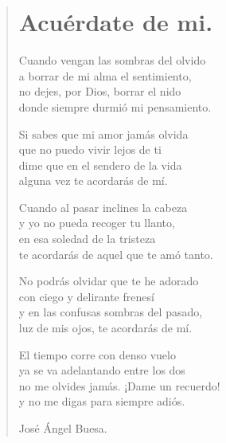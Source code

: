 \documentclass[11pt, portrait, twoside, notitlepage, openright]{book}
\begin{document}
\newpage
\begin{verse}
\begin{center}
\section{Acuérdate de mi.}
\end{center}
Cuando vengan las sombras del olvido\\
a borrar de mi alma el sentimiento,\\
no dejes, por Dios, borrar el nido\\
donde siempre durmió mi pensamiento.
\newline

Si sabes que mi amor jamás olvida\\
que no puedo vivir lejos de ti\\
dime que en el sendero de la vida\\
alguna vez te acordarás de mí.
\newline

Cuando al pasar inclines la cabeza\\
y yo no pueda recoger tu llanto,\\
en esa soledad de la tristeza\\
te acordarás de aquel que te amó tanto.
\newline

No podrás olvidar que te he adorado\\
con ciego y delirante frenesí\\
y en las confusas sombras del pasado,\\
luz de mis ojos, te acordarás de mí.
\newpage

El tiempo corre con denso vuelo\\
ya se va adelantando entre los dos\\
no me olvides jamás. ¡Dame un recuerdo!\\
y no me digas para siempre adiós.
\newline

José Ángel Buesa.
\end{verse}
\end{document}
